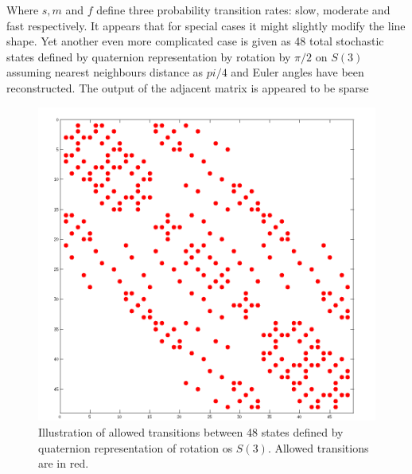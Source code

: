 Where $s,m$ and $f$ define three probability transition rates: slow, moderate and fast respectively. It appears that for special cases it might slightly modify the line shape. Yet another even more complicated case is given as 48 total stochastic states defined by quaternion representation by rotation by $\pi/2$ on $S(3)$ assuming nearest neighbours distance as $pi/4$ and Euler angles have been reconstructed. The output of the adjacent matrix is appeared to be sparse
\begin{figure}[h!]
\begin{center}
\includegraphics[scale=0.5]{figures/chap2/sparce.png}
\caption{Illustration of allowed transitions between 48 states defined by quaternion representation of  rotation os $S(3)$. Allowed transitions are in red. }
\label{figure:blumediag}
\end{center}
\end{figure}  
\clearpage
